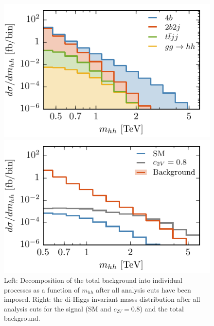 \begin{figure}[h!]
	\centering
	\begin{minipage}{0.49\textwidth}\centering
		\includegraphics[width=\textwidth]{section3/plots/mhh_all_absxs_bkgcomp_014tev.pdf}
	\end{minipage}
		\begin{minipage}{0.49\textwidth}\centering
		\includegraphics[width=\textwidth]{section3/plots/mhh_all_absxs_014tev_main.pdf}
	\end{minipage}
	\caption{\small Left: Decomposition of the total
          background into individual processes as a function of $m_{hh}$
          after all analysis cuts have been imposed.
	  Right: the di-Higgs invariant masss distribution after all analysis cuts
	  for the signal (SM and $c_{2V}=0.8$) and the total background.
	}
	\label{fig:mhhdist} 
\end{figure}

